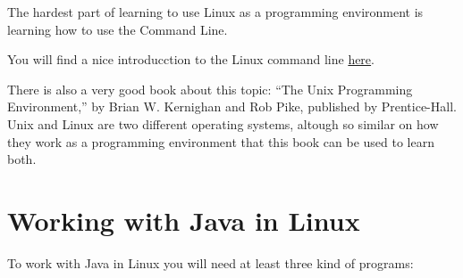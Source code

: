\documentclass[a4paper, 12pt]{article}
\begin{document}
The hardest part of learning to use Linux as a programming environment is
learning how to use the Command Line.

You will find a nice introducction to the Linux command line
\href{http://linuxcommand.org/lc3_learning_the_shell.php#contents}{here}.

There is also a very good book about this topic: ``The Unix Programming
Environment,'' by Brian W. Kernighan and Rob Pike, published by Prentice-Hall.
Unix and Linux are two different operating systems, altough so similar on how
they work as a programming environment that this book can be used to learn
both.


\section{Working with Java in Linux}

To work with Java in Linux you will need at least three kind of programs:
\end{document}
